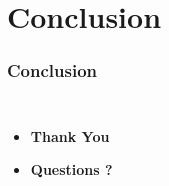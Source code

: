 \documentclass[11pt]{beamer}
\begin{document}

\section{Conclusion}
\begin{frame}
\frametitle{Conclusion}
\begin{columns}
\column{\textwidth}
\centering
\begin{itemize}
\item \textbf{Thank You}
\item \textbf{Questions ?}
\end{itemize}
\end{columns}
\end{frame}

\end{document}
